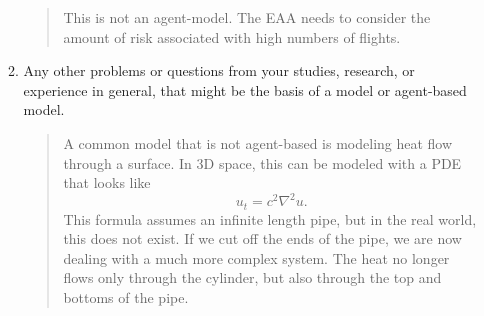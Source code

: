 \documentclass{hw}
\begin{document}
\begin{enumerate}
\begin{enumerate}
\begin{quote}
This is not an agent-model. The EAA needs to consider the amount of risk associated with high numbers
of flights.
\end{quote}
\item Any other problems or questions from your studies, research, or experience in general, that might
be the basis of a model or agent-based model.
\begin{quote}
A common model that is not agent-based is modeling heat flow through a surface. In 3D space, this can be
modeled with a PDE that looks like
\[
u_{t} = c^{2}\nabla^{2}u.
\]
This formula assumes an infinite length pipe, but in the real world, this does not exist. If we cut off
the ends of the pipe, we are now dealing with a much more complex system. The heat no longer flows
only through the cylinder, but also through the top and bottoms of the pipe.
\end{quote}
\end{enumerate}
\end{enumerate}
\end{document}
